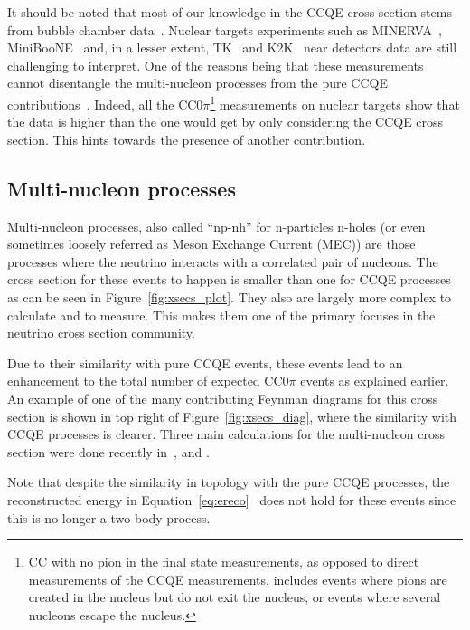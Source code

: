 It should be noted that most of our knowledge in the \Gls{CCQE} cross
section stems from bubble chamber
data~\cite{ANLCCQE,BNLCCQE,CERNCCQE}. Nuclear targets experiments such
as \Gls{MINERVA}~\cite{MinervaNuCCQE},
\Gls{MiniBooNE}~\cite{MiniBooNENuCCQE} and, in a lesser extent,
\Gls{TK}~\cite{T2KCCQE} and \Gls{K2K}~\cite{K2KCCQE} near detectors
data are still challenging to interpret. One of the reasons being that
these measurements cannot disentangle the multi-nucleon processes from
the pure \Gls{CCQE} contributions~\cite{CallumFit}. Indeed, all the
\Gls{CC}$0\pi$\footnote{\Gls{CC} with no pion in the final state
  measurements, as opposed to direct measurements of the \Gls{CCQE}
  measurements, includes events where pions are created in the nucleus
  but do not exit the nucleus, or events where several nucleons escape
  the nucleus.} measurements on nuclear targets show that the data is
higher than the one would get by only considering the \Gls{CCQE} cross
section. This hints towards the presence of another contribution.

\subsection{Multi-nucleon processes}
Multi-nucleon processes, also called ``np-nh'' for n-particles n-holes
(or even sometimes loosely referred as Meson Exchange Current
(\Gls{MEC})) are those processes where the neutrino interacts with a
correlated pair of nucleons. The cross section for these events to
happen is smaller than one for \Gls{CCQE} processes as can be seen in
Figure~\ref{fig:xsecs_plot}. They also are largely more complex to
calculate and to measure. This makes them one of the primary focuses
in the neutrino cross section community.

Due to their similarity with pure \Gls{CCQE} events, these events lead
to an enhancement to the total number of expected \Gls{CC}$0\pi$
events as explained earlier. An example of one of the many
contributing Feynman diagrams for this cross section is shown in top
right of Figure~\ref{fig:xsecs_diag}, where the similarity with
\Gls{CCQE} processes is clearer. Three main calculations for the
multi-nucleon cross section were done recently
in~\cite{MartiniNpNh1,MartiniNpNh2}, \cite{NievesNpNh1,NievesNpNh2}
and \cite{AmaroNpNh1,AmaroNpNh2}.

Note that despite the similarity in topology with the pure \Gls{CCQE}
processes, the reconstructed energy in
Equation~\ref{eq:ereco}~\cite{MartiniERec} does not hold for these
events since this is no longer a two body process.

